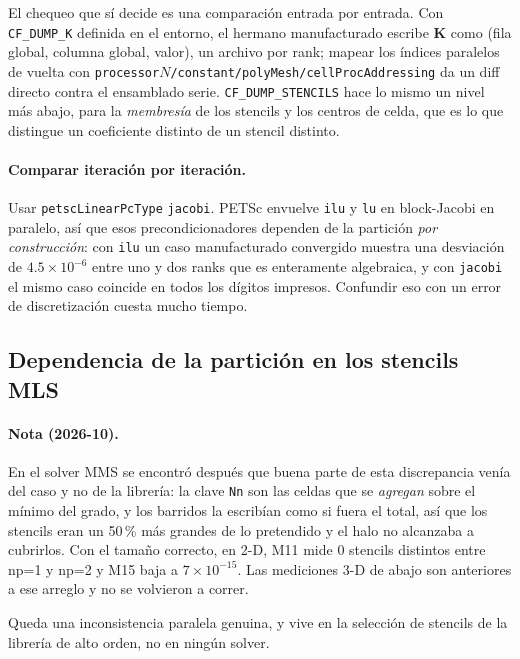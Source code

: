 \documentclass[11pt,a4paper]{article}
\newcommand{\code}[1]{\texttt{\small #1}}
\newcommand{\Kstif}{\mathbf{K}}
\newcommand{\dictkey}[1]{\textcolor{black!60!green}{\texttt{\footnotesize #1}}}
\begin{document}
El chequeo que sí decide es una comparación entrada por entrada. Con
\code{CF\_DUMP\_K} definida en el entorno, el hermano manufacturado escribe
$\Kstif$ como (fila global, columna global, valor), un archivo por rank; mapear
los índices paralelos de vuelta con
\code{processor$N$/constant/polyMesh/cellProcAddressing} da un diff directo
contra el ensamblado serie. \code{CF\_DUMP\_STENCILS} hace lo mismo un nivel más
abajo, para la \emph{membresía} de los stencils y los centros de celda, que es lo
que distingue un coeficiente distinto de un stencil distinto.

\paragraph{Comparar iteración por iteración.} Usar
\dictkey{petscLinearPcType} \code{jacobi}. PETSc envuelve \code{ilu} y \code{lu}
en block-Jacobi en paralelo, así que esos precondicionadores dependen de la
partición \emph{por construcción}: con \code{ilu} un caso manufacturado
convergido muestra una desviación de $4.5\times10^{-6}$ entre uno y dos ranks que
es enteramente algebraica, y con \code{jacobi} el mismo caso coincide en todos
los dígitos impresos. Confundir eso con un error de discretización cuesta mucho
tiempo.

\subsection{Dependencia de la partición en los stencils MLS}
\label{sec:dist-stencils}

\paragraph{Nota (2026-10).} En el solver MMS se encontró después que buena parte de
esta discrepancia venía del caso y no de la librería: la clave \code{Nn} son las
celdas que se \emph{agregan} sobre el mínimo del grado, y los barridos la
escribían como si fuera el total, así que los stencils eran un 50\,\% más grandes
de lo pretendido y el halo no alcanzaba a cubrirlos. Con el tamaño correcto, en
2-D, M11 mide 0 stencils distintos entre np=1 y np=2 y M15 baja a $7\times10^{-15}$.
Las mediciones 3-D de abajo son anteriores a ese arreglo y no se volvieron a correr.

Queda una inconsistencia paralela genuina, y vive en la selección de stencils de
la librería de alto orden, no en ningún solver.
\end{document}
